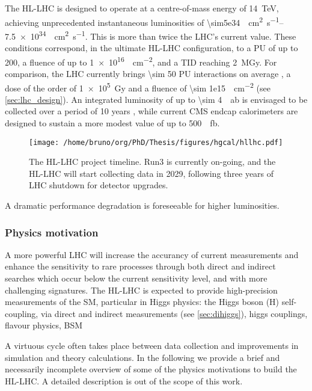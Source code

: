 \documentclass[11pt]{article}
\begin{document}
The \ac{HL-LHC} is designed to operate at a centre-of-mass energy of \SI{14}{\TeV}, achieving unprecedented instantaneous luminosities of \SIrange{\sim5e34}{7.5e34}{\per\cm\squared\per\second}.
This is more than twice the \ac{LHC}’s current value.
These conditions correspond, in the ultimate HL-LHC configuration, to a \ac{PU} of up to 200, a fluence of up to \SI{1e16}{\nequiv\per\cm\squared}, and a \ac{TID} reaching \SI{2}{\mega\gray}.
For comparison, the \ac{LHC} currently brings \num{\sim 50} \ac{PU} interactions on average \cite{pileup_twiki}, a dose of the order of \SI{1e5}{\gray} and a fluence of \SI{\sim 1e15}{\nequiv\per\cm\squared} \cite{lhc_fluences} (see \cref{sec:lhc_design}).
An integrated luminosity of up to \SI{\sim 4}{\per\atto\barn} is envisaged to be collected over a period of 10 years \cite{hllhc}, while current \ac{CMS} endcap calorimeters are designed to sustain a more modest value of up to \SI{500}{\per\femto\barn}.

\begin{figure}[htbp]
\centering
\texttt{[image: /home/bruno/org/PhD/Thesis/figures/hgcal/hllhc.pdf]}
\caption{\label{fig:hllhc}The \ac{HL-LHC} project timeline. Run3 is currently on-going, and the \ac{HL-LHC} will start collecting data in 2029, following three years of \ac{LHC} shutdown for detector upgrades.}
\end{figure}

A dramatic performance degradation is foreseeable for higher luminosities.


\subsubsection{Physics motivation}
\label{sec:org9ec67e8}
\label{sec:hllhc_physics}

A more powerful \ac{LHC} will increase the accurancy of current measurements and enhance the sensitivity to rare processes through both direct and indirect searches which occur below the current sensitivity level, and with more challenging signatures.
The \ac{HL-LHC} is expected to provide high-precision measurements of the \ac{SM}, particular in Higgs physics: the Higgs boson (H) self-coupling, via direct and indirect measurements (see \cref{sec:dihiggs}), higgs couplings, flavour physics, BSM

A virtuous cycle often takes place between data collection and improvements in simulation and theory calculations.
In the following we provide a brief and necessarily incomplete overview of some of the physics motivations to build the \ac{HL-LHC}.
A detailed description is out of the scope of this work.
\end{document}
